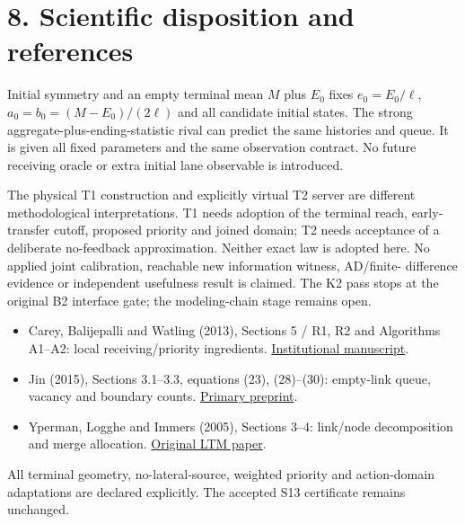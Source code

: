 \documentclass[11pt,a4paper]{article}
\begin{document}
\section*{8. Scientific disposition and references}
Initial symmetry and an empty terminal mean $M$ plus $E_0$ fixes
$e_0=E_0/\ell$, $a_0=b_0=(M-E_0)/(2\ell)$ and all candidate initial states.
The strong aggregate-plus-ending-statistic rival can predict the same histories
and queue. It is given all fixed parameters and the same observation contract.
No future receiving oracle or extra initial lane observable is introduced.

The physical T1 construction and explicitly virtual T2 server are different
methodological interpretations. T1 needs adoption of the terminal reach,
early-transfer cutoff, proposed priority and joined domain; T2 needs acceptance
of a deliberate no-feedback approximation. Neither exact law is adopted here.
No applied joint calibration, reachable new information witness, AD/finite-
difference evidence or independent usefulness result is claimed. The K2 pass
stops at the original B2 interface gate; the modeling-chain stage remains open.

\begin{itemize}
\item Carey, Balijepalli and Watling (2013), Sections 5 / R1, R2 and Algorithms
A1--A2: local receiving/priority ingredients.
\href{https://eprints.whiterose.ac.uk/id/eprint/77315/7/Carey\%20et\%20al\%202013_with_coversheet.pdf}{Institutional manuscript}.
\item Jin (2015), Sections 3.1--3.3, equations (23), (28)--(30): empty-link
queue, vacancy and boundary counts.
\href{https://arxiv.org/pdf/1405.7080}{Primary preprint}.
\item Yperman, Logghe and Immers (2005), Sections 3--4: link/node decomposition
and merge allocation.
\href{https://www.mech.kuleuven.be/cib/verkeer/dwn/pub/P2005C.pdf}{Original LTM paper}.
\end{itemize}
All terminal geometry, no-lateral-source, weighted priority and action-domain
adaptations are declared explicitly. The accepted S13 certificate remains
unchanged.
\end{document}
